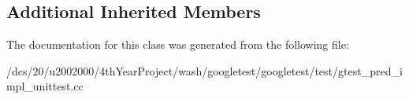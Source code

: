 \subsection*{Additional Inherited Members}


The documentation for this class was generated from the following file\+:\begin{DoxyCompactItemize}
\item 
/dcs/20/u2002000/4th\+Year\+Project/wash/googletest/googletest/test/gtest\+\_\+pred\+\_\+impl\+\_\+unittest.\+cc\end{DoxyCompactItemize}
